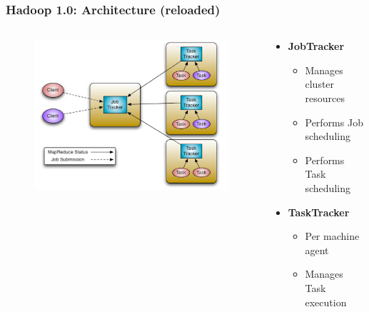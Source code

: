 \begin{frame}
\frametitle{Hadoop 1.0: Architecture (reloaded)}
\begin{columns}[onlytextwidth]
  \begin{column}{0.3\textwidth}
    \begin{figure}[h]
    \centering
    \includegraphics[scale=0.35]{./figures/yarn_hadoop1_arch}
    \label{fig:yarn_h1_arch}
    \end{figure}
  \end{column}

  \begin{column}{0.5\textwidth}
    \begin{itemize}
      \item {\bf JobTracker}
      \begin{itemize}
        \item Manages cluster resources
        \item Performs Job scheduling
        \item Performs Task scheduling
      \end{itemize}
      \item {\bf TaskTracker}
      \begin{itemize}
        \item Per machine agent
        \item Manages Task execution
      \end{itemize}
    \end{itemize}
  \end{column}
\end{columns}
\end{frame}

